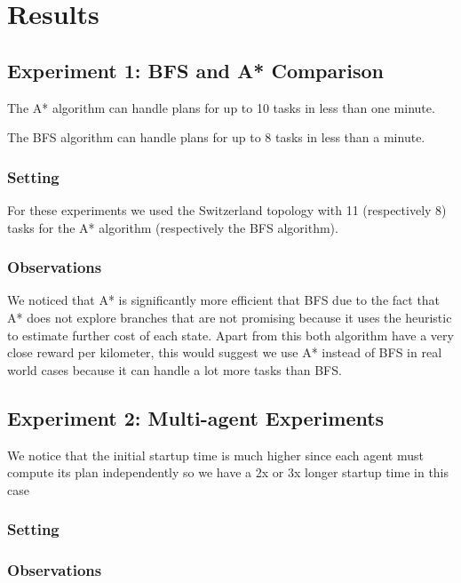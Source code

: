 \documentclass[11pt]{article}
\begin{document}
\section{Results}

\subsection{Experiment 1: BFS and A* Comparison}
The A* algorithm can handle plans for up to 10 tasks in less than one
minute.

The BFS algorithm can handle plans for up to 8 tasks in less than a
minute.

\subsubsection{Setting}
For these experiments we used the Switzerland topology with 11
(respectively 8) tasks for the A* algorithm (respectively the BFS
algorithm).

\subsubsection{Observations}

We noticed that A* is significantly more efficient that BFS due to the
fact that A* does not explore branches that are not promising because
it uses the heuristic to estimate further cost of each state. Apart
from this both algorithm have a very close reward per kilometer, this
would suggest we use A* instead of BFS in real world cases because it
can handle a lot more tasks than BFS.


\subsection{Experiment 2: Multi-agent Experiments}

We notice that the initial startup time is much higher since each
agent must compute its plan independently so we have a 2x or 3x longer
startup time in this case

\subsubsection{Setting}

\subsubsection{Observations}
\end{document}
